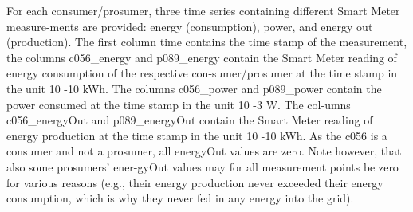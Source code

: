 For each consumer/prosumer, three time series containing different Smart Meter measure-ments are provided: energy (consumption), power, and energy out (production). The first column time contains the time stamp of the measurement, the columns c056_energy and p089_energy contain the Smart Meter reading of energy consumption of the respective con-sumer/prosumer at the time stamp in the unit 10 -10 kWh. The columns c056_power and p089_power contain the power consumed at the time stamp in the unit 10 -3 W. The col-umns c056_energyOut and p089_energyOut contain the Smart Meter reading of energy production at the time stamp in the unit 10 -10 kWh. As the c056 is a consumer and not a prosumer, all energyOut values are zero. Note however, that also some prosumers’ ener-gyOut values may for all measurement points be zero for various reasons (e.g., their energy production never exceeded their energy consumption, which is why they never fed in any energy into the grid). 


\subsubsection{}




